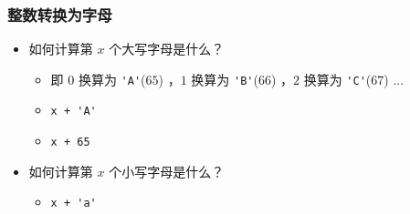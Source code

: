 \begin{frame}[fragile]
    \frametitle{整数转换为字母}

    \begin{itemize}
        \item 如何计算第 $x$ 个大写字母是什么？
        
        \begin{itemize}
            \item 即 $0$ 换算为 \lstinline|'A'|($65$) ，$1$ 换算为 \lstinline|'B'|($66$) ，$2$ 换算为 \lstinline|'C'|($67$) ...
            \item<2-> \lstinline|x + 'A'|
            \item<2-> \lstinline|x + 65|
        \end{itemize}

        \item<3-> 如何计算第 $x$ 个小写字母是什么？
        
        \begin{itemize}
            \item<4-> \lstinline|x + 'a'|
        \end{itemize}

    \end{itemize}

\end{frame}

